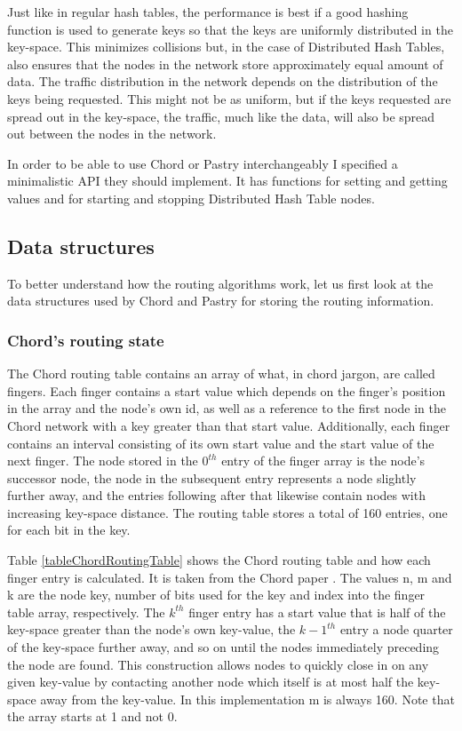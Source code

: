 Just like in regular hash tables, the performance is best if a good hashing function is used to generate keys so that the keys are uniformly distributed in the key-space. This minimizes collisions but, in the case of Distributed Hash Tables, also ensures that the nodes in the network store approximately equal amount of data. The traffic distribution in the network depends on the distribution of the keys being requested. This might not be as uniform, but if the keys requested are spread out in the key-space, the traffic, much like the data, will also be spread out between the nodes in the network.

In order to be able to use Chord or Pastry interchangeably I specified a minimalistic API they should implement. It has functions for setting and getting values and for starting and stopping Distributed Hash Table nodes.

\subsection{Data structures}
To better understand how the routing algorithms work, let us first look at the data structures used by Chord and Pastry for storing the routing information.

\subsubsection{Chord's routing state}
\label{sec:chordRoutingState}
The Chord routing table contains an array of what, in chord jargon, are called fingers.
Each finger contains a start value which depends on the finger's position in the array and the node's own id, as well as a reference to the first node in the Chord network with a key greater than that start value.
Additionally, each finger contains an interval consisting of its own start value and the start value of the next finger.
The node stored in the $ 0^{th} $ entry of the finger array is the node's successor node, the node in the subsequent entry represents a node slightly further away, and the entries following after that likewise contain nodes with increasing key-space distance.
The routing table stores a total of 160 entries, one for each bit in the key.

Table \ref{tableChordRoutingTable} shows the Chord routing table and how each finger entry is calculated. It is taken from the Chord paper \cite{chord}. The values n, m and k are the node key, number of bits used for the key and index into the finger table array, respectively. 
The $ k^{th} $ finger entry has a start value that is half of the key-space greater than the node's own key-value, the $ k-1^{th} $ entry a node quarter of the key-space further away, and so on until the nodes immediately preceding the node are found.
This construction allows nodes to quickly close in on any given key-value by contacting another node which itself is at most half the key-space away from the key-value.
In this implementation m is always 160. Note that the array starts at 1 and not 0.

